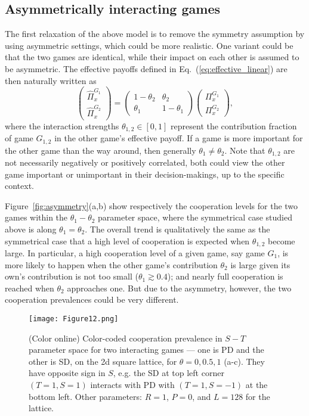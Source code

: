 \documentclass[showpacs,superscriptaddress,reprint,nofootinbib,amsmath,amssymb,aps,pre]{revtex4-1}
\begin{document}
\subsection{Asymmetrically interacting games}
The first relaxation of the above model is to remove the symmetry assumption by using asymmetric settings, which could be more realistic.
One variant could be that the two games are identical, while their impact on each other is assumed to be asymmetric. The effective payoffs defined in Eq.~(\ref{eq:effective_linear}) are then naturally written as
\begin{equation}
\begin{pmatrix}
\widehat\Pi^{G_1}_{x} \\ \widehat\Pi^{G_2}_{x} 
\end{pmatrix}
=
\begin{pmatrix}
1\!-\!\theta_2 & \theta_2 \\
\theta_1 & 1\!-\!\theta_1\!  
\end{pmatrix}
\begin{pmatrix}
\Pi^{G_1}_{x} \\ \Pi^{G_2}_{x} 
\end{pmatrix},
\label{eq:asy}
\end{equation}
where the interaction strengths $\theta_{1,2}\in[0,1]$ represent the contribution fraction of game $G_{1,2}$ in the other game's effective payoff.
If a game is more important for the other game than the way around, then generally $\theta_1\!\neq\! \theta_2$. Note that $\theta_{1,2}$ are not necessarily negatively or positively correlated, both could view the other game important or unimportant in their decision-makings, up to the specific context. 

Figure~{\ref{fig:asymmetry}}(a,b) show respectively the cooperation levels for the two games within the $\theta_1 - \theta_2$ parameter space, where the symmetrical case studied above is along $\theta_1\!=\!\theta_2$. The overall trend is qualitatively the same as the symmetrical case that a high level of cooperation is expected when $\theta_{1,2}$ become large. In particular, a high cooperation level of a given game, say game $G_1$,  is more likely to happen when the other game's contribution $\theta_2$ is large given its own's contribution is not too small ($\theta_1\gtrsim 0.4$); and nearly full cooperation is reached when $\theta_2$ approaches one. But due to the asymmetry, however, the two cooperation prevalences could be very different.

\begin{figure}[htbp]
\centering
\texttt{[image: Figure12.png]}
\caption{(Color online)
Color-coded cooperation prevalence in $S-T$ parameter space for two interacting games --- one is PD and the other is SD, on the 2d square lattice, for $\theta=0, 0.5, 1$ (a-c). They have opposite sign in $S$, e.g. the SD at top left corner $(T=1,S=1)$ interacts with PD with $(T=1,S=-1)$ at the bottom left. 
Other parameters: $R=1$, $P=0$, and $L=128$ for the lattice.
}
\label{fig:PD_SD}
\end{figure}
\end{document}
